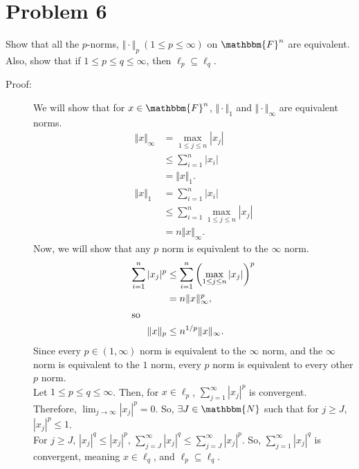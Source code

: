\documentclass[10pt]{extarticle}
\newcommand{\N}{\mathbbm{N}}
\begin{document}
  \section{Problem 6}%
  Show that all the $p$-norms, $\Vert \cdot \Vert_p~(1\leq p \leq \infty)$ on $\mathbbm{F}^n$ are equivalent. Also, show that if $1\leq p \leq q \leq \infty$, then $\ell_p \subseteq \ell_q$.
  \begin{description}
    \item[Proof:] We will show that for $x\in \mathbbm{F}^n$, $\Vert \cdot \Vert_1$ and $\Vert \cdot \Vert_{\infty}$ are equivalent norms.
      \begin{align*}
        \Vert x \Vert_{\infty} &= \max_{1\leq j \leq n}|x_j|\\
                               &\leq \sum_{i=1}^{n}|x_i|\\
                               &= \Vert x \Vert_1.\\
        \Vert x \Vert_{1} &= \sum_{i=1}^{n}|x_i|\\
                          &\leq \sum_{i=1}^{n}\max_{1\leq j \leq n}|x_j|\\
                          &= n\Vert x \Vert_{\infty}.
      \end{align*}
      Now, we will show that any $p$ norm is equivalent to the $\infty$ norm.
      \begin{align*}
        \sum_{i=1}^{n}|x_j|^p&\leq \sum_{i=1}^{n}\left(\max_{1\leq j\leq n}|x_j|\right)^p\\
                             &= n\Vert x\Vert_{\infty}^{p},\\
                             \shortintertext{so}
        \Vert x\Vert_{p} &\leq n^{1/p}\Vert x \Vert_{\infty}.
      \end{align*}
      Since every $p\in (1,\infty)$ norm is equivalent to the $\infty$ norm, and the $\infty$ norm is equivalent to the $1$ norm, every $p$ norm is equivalent to every other $p$ norm.\\

      Let $1\leq p \leq q \leq \infty$. Then, for $x\in \ell_{p}$, $\sum_{j=1}^{\infty} |x_j|^{p}$ is convergent.\\

      Therefore, $\lim_{j\rightarrow\infty} |x_j|^{p} = 0$. So, $\exists J\in \N$ such that for $j\geq J$, $|x_j|^{p} \leq 1$.\\

      For $j\geq J$, $|x_j|^q \leq |x_j|^{p}$, $\sum_{j=J}^{\infty}|x_j|^{q} \leq \sum_{j=J}^{\infty}|x_j|^{p}$. So, $\sum_{j=1}^{\infty}|x_j|^{q}$ is convergent, meaning $x\in \ell_{q}$, and $\ell_{p} \subseteq \ell_{q}$.
  \end{description}
\end{document}
